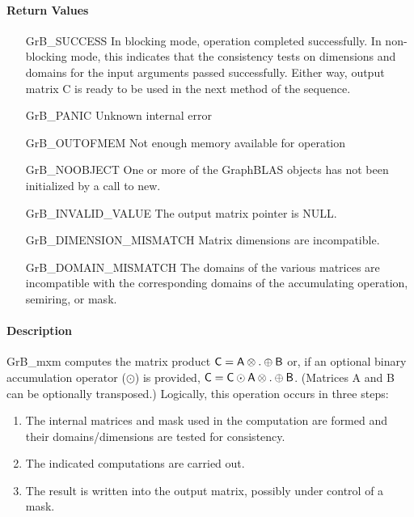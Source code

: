 \paragraph{Return Values}

\begin{itemize}[leftmargin=2.1in]

	\item[{\sf GrB\_SUCCESS}]	      In blocking mode, operation
	completed successfully. In non-blocking mode, this indicates
	that the consistency tests on dimensions and domains for the
	input arguments passed successfully. Either way, output matrix
	{\sf C} is ready to be used in the next method of the sequence.

	\item[{\sf GrB\_PANIC}]		      Unknown internal error

	\item[{\sf GrB\_OUTOFMEM}]	      Not enough memory available
	for operation
    
    \item[{\sf GrB\_NOOBJECT}]        One or more of the GraphBLAS objects has 
    not been initialized by a call to {\sf new}.
    
    \item[{\sf GrB\_INVALID\_VALUE}]  The output matrix pointer is {\sf NULL}.

	\item[{\sf GrB\_DIMENSION\_MISMATCH}] Matrix dimensions are
	incompatible.

	\item[{\sf GrB\_DOMAIN\_MISMATCH}]    The domains of the various
	matrices are incompatible with the corresponding domains of the
	accumulating operation, semiring, or mask.

\end{itemize}

\paragraph{Description}

{\sf GrB\_mxm} computes the matrix product ${\bf \sf C} = {\bf \sf
A} \otimes . \oplus {\bf \sf B}$ or, if an optional binary accumulation
operator ($\odot$) is provided, ${\bf \sf C} = {\bf \sf C} \odot
{\bf \sf A} \otimes . \oplus {\bf \sf B}$.  (Matrices {\sf A}
and {\sf B} can be optionally transposed.)  Logically, this operation
occurs in three steps:
\begin{enumerate}
\item The internal matrices and mask used in the computation are formed and their domains/dimensions are tested for consistency.
\item The indicated computations are carried out.
\item The result is written into the output matrix, possibly under control of a mask.
\end{enumerate}

